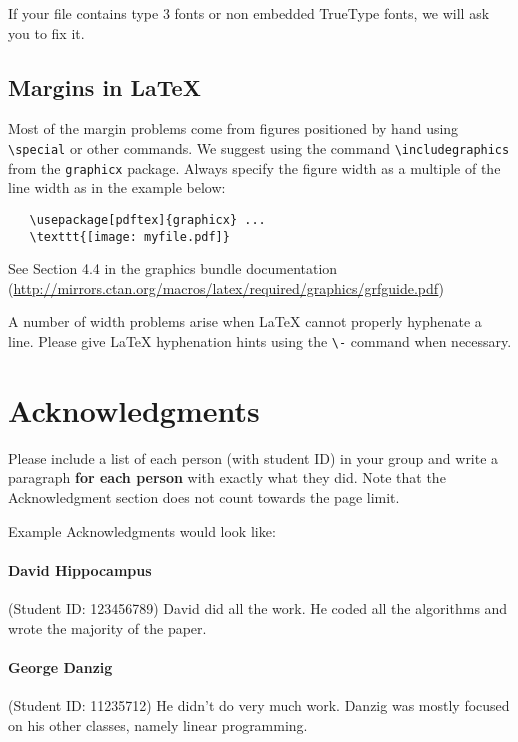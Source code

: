 \documentclass{article}
\begin{document}
If your file contains type 3 fonts or non embedded TrueType fonts, we will ask
you to fix it.


\subsection{Margins in \LaTeX{}}


Most of the margin problems come from figures positioned by hand using
\verb+\special+ or other commands. We suggest using the command
\verb+\includegraphics+ from the \verb+graphicx+ package. Always specify the
figure width as a multiple of the line width as in the example below:
\begin{verbatim}
   \usepackage[pdftex]{graphicx} ...
   \texttt{[image: myfile.pdf]}
\end{verbatim}
See Section 4.4 in the graphics bundle documentation
(\url{http://mirrors.ctan.org/macros/latex/required/graphics/grfguide.pdf})


A number of width problems arise when \LaTeX{} cannot properly hyphenate a
line. Please give LaTeX hyphenation hints using the \verb+\-+ command when
necessary.

\newpage

\section*{Acknowledgments}
Please include a list of each person (with student ID) in your group
and write a paragraph \textbf{for each person} with exactly what they
did. Note that the Acknowledgment section does not count towards the
page limit.

Example Acknowledgments would look like:

\paragraph{David Hippocampus} (Student ID: 123456789) David did all
the work. He coded all the algorithms and wrote the majority of the
paper.

\paragraph{George Danzig} (Student ID: 11235712) He didn't do very
much work. Danzig was mostly focused on his other classes, namely
linear programming. 




\end{document}
